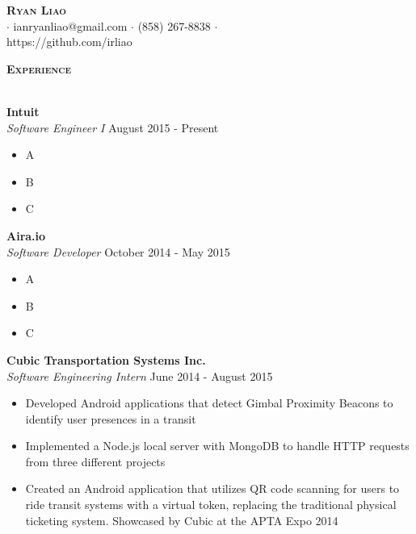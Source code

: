 \documentclass{article}
\newcommand{\lineunder} {
    \vspace*{-8pt} \\
    \hspace*{-18pt} \hrulefill \\
}
\newcommand{\header} [1] {
    {\hspace*{-18pt}\vspace*{6pt} \large{\textbf{\textsc{#1}}}}
    \vspace*{-6pt} \lineunder
}
\begin{document}
\vspace*{-40pt}

\vspace*{-10pt}
\begin{center}
	{\Large \scshape \textbf{Ryan Liao}}\\
	$\cdot$ ianryanliao@gmail.com $\cdot$ (858) 267-8838 $\cdot$\\ https://github.com/irliao\\
\end{center}

\vspace*{2mm}

\header{Experience}
\vspace{1mm}

\textbf{Intuit} \hfill \\
\textit{Software Engineer I} \hfill August 2015 - Present
\vspace{-1mm}
\begin{itemize} \itemsep -1pt
	\item A
	\item B
	\item C
\end{itemize}

\textbf{Aira.io} \hfill \\
\textit{Software Developer} \hfill October 2014 - May 2015
\vspace{-1mm}
\begin{itemize} \itemsep -1pt
	\item A
	\item B
	\item C
\end{itemize}

\textbf{Cubic Transportation Systems Inc.} \hfill \\
\textit{Software Engineering Intern} \hfill June 2014 - August 2015
\vspace{-1mm}
\begin{itemize} \itemsep -1pt
	\item Developed Android applications that detect Gimbal Proximity Beacons to identify user presences in a transit
	\item Implemented a Node.js local server with MongoDB to handle HTTP requests from three different projects
	\item Created an Android application that utilizes QR code scanning for users to ride transit systems with a virtual token, replacing the traditional physical ticketing system. Showcased by Cubic at the APTA Expo 2014
\end{itemize}
\end{document}
